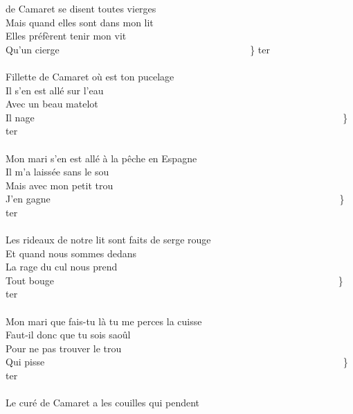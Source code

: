 
 de Camaret se disent toutes vierges \bissimple
\\Mais quand elles sont dans mon lit
\\Elles préfèrent tenir mon vit
\\Qu'un cierge ~~~~~~~~~~~~~~~~~~~~~~~~~~~~~~~~~~~~~~ \} ter
\\\\Fillette de Camaret où est ton pucelage ~~~~~~~~~~~~~~~~~~~~\bissimple
\\Il s'en est allé sur l'eau
\\Avec un beau matelot
\\Il nage ~~~~~~~~~~~~~~~~~~~~~~~~~~~~~~~~~~~~~~~~~~~~~~~~~~~~~~~~~~~~~~~\} ter
\\\\Mon mari s'en est allé à la pêche en Espagne ~~~~~~~~~~~~~\bissimple
\\Il m'a laissée sans le sou
\\Mais avec mon petit trou
\\J'en gagne ~~~~~~~~~~~~~~~~~~~~~~~~~~~~~~~~~~~~~~~~~~~~~~~~~~~~~~~~~~~\}  ter
\\\\Les rideaux de notre lit sont faits de serge rouge  ~~~~~~~~~\bissimple
\\Et quand nous sommes dedans
\\La rage du cul nous prend
\\Tout bouge ~~~~~~~~~~~~~~~~~~~~~~~~~~~~~~~~~~~~~~~~~~~~~~~~~~~~~~~~~~\} ter
\\\\Mon mari que fais-tu là tu me perces la cuisse  ~~~~~~~~~~~~\bissimple
\\Faut-il donc que tu sois saoûl
\\Pour ne pas trouver le trou
\\Qui pisse ~~~~~~~~~~~~~~~~~~~~~~~~~~~~~~~~~~~~~~~~~~~~~~~~~~~~~~~~~~~~~\} ter
\\\\Le curé de Camaret a les couilles qui pendent  ~~~~~~~~~~~~~\bissimple
